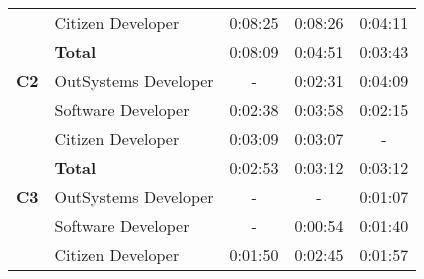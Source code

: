 \begin{table}[tb]
\begin{tabular}{llrrr}
                              & Citizen Developer    & 0:08:25                                                           & 0:08:26                                                                 & 0:04:11                                                       \\
                              & \textbf{Total}       & 0:08:09                                                           & 0:04:51                                                                 & 0:03:43                                                       \\ \hline
    \textbf{C2}               & OutSystems Developer & \multicolumn{1}{c}{-}                                             & 0:02:31                                                                 & 0:04:09                                                       \\
                              & Software Developer   & 0:02:38                                                           & 0:03:58                                                                 & 0:02:15                                                       \\
                              & Citizen Developer    & 0:03:09                                                           & 0:03:07                                                                 & \multicolumn{1}{c}{-}                                         \\
                              & \textbf{Total}       & 0:02:53                                                           & 0:03:12                                                                 & 0:03:12                                                       \\ \hline
    \textbf{C3}               & OutSystems Developer & \multicolumn{1}{c}{-}                                             & \multicolumn{1}{c}{-}                                                   & 0:01:07                                                       \\
                              & Software Developer   & \multicolumn{1}{c}{-}                                             & 0:00:54                                                                 & 0:01:40                                                       \\
                              & Citizen Developer    & 0:01:50                                                           & 0:02:45                                                                 & 0:01:57                                                       \\

\end{tabular}
\end{table}
